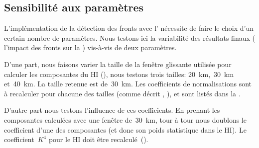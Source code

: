 \begin{figure}
  \centering
  \label{fig:hists-sst-latbands}
\end{figure}

\subsection{Sensibilité aux paramètres}
\label{sec:sensibilite-parametres}

L'implémentation de la détection des fronts avec l' nécessite de faire le choix d'un certain nombre de paramètres. Nous testons ici la variabilité des résultats finaux ( l'impact des fronts sur la ) vis-à-vis de deux paramètres.

D'une part, nous faisons varier la taille de la fenêtre glissante utilisée pour calculer les composantes du HI (), nous testons trois tailles: \qty{20}{\km},~\qty{30}{\km} et~\qty{40}{\km}. La taille retenue est de~\qty{30}{\km}.
Les coefficients de normalisations sont à recalculer pour chacune des tailles (comme décrit , ), et sont listés dans la .

D'autre part nous testons l'influence de ces coefficients. En prenant les composantes calculées avec une fenêtre de~\qty{30}{\km}, tour à tour nous doublons le coefficient d'une des composantes (et donc son poids statistique dans le HI). Le coefficient~\(K^4\) pour le HI doit être recalculé~().

